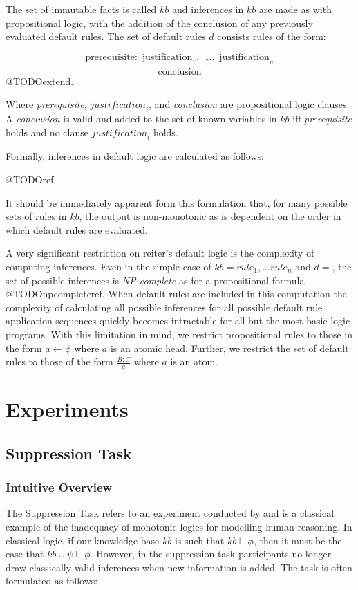 \documentclass[
11pt, %
english, %
singlespacing, %
headsepline, %
]{MastersDoctoralThesis} %
\begin{document}
The set of immutable facts is called $kb$ and inferences in $kb$ are made as with propositional logic, with the addition of the conclusion of any previously evaluated default rules. The set of default rules $d$ consists rules of the form:

\[\frac{\textrm{prerequisite}:\textrm{ justification}_1, \textrm{ ...}, \textrm{ justification}_n}{\textrm{conclusion}}\] @TODOextend.

Where \textit{prerequisite}, $\textit{justification}_i$, and \textit{conclusion} are propositional logic clauses. A \textit{conclusion} is valid and added to the set of known variables in $kb$ iff \textit{prerequisite} holds and no clause $\textit{justification}_i$ holds.

Formally, inferences in default logic are calculated as follows:

@TODOref

It should be immediately apparent form this formulation that, for many possible sets of rules in $kb$, the output is non-monotonic as is dependent on the order in which default rules are evaluated.

A very significant restriction on reiter's default logic is the complexity of computing inferences. Even in the simple case of $kb={rule_1,...rule_n}$ and $d={}$, the set of possible inferences is \textit{NP-complete} as for a propositional formula @TODOnpcompleteref. When default rules are included in this computation the complexity of calculating all possible inferences for all possible default rule application sequences quickly becomes intractable for all but the most basic logic programs. With this limitation in mind, we restrict propositional rules to those in the form $a\leftarrow\phi$ where $a$ is an atomic head. Further, we restrict the set of default rules to those of the form $\frac{B:C}{a}$ where $a$ is an atom.


\chapter{Experiments} \label{chp:experiments}
\section{Suppression Task} \label{sec:sup}
\subsection{Intuitive Overview} \label{ssec:sup_intuition}
The Suppression Task refers to an experiment conducted by \cite{byrne1989suppressing} and is a classical example of the inadequacy of monotonic logics for modelling human reasoning. In classical logic, if our knowledge base $kb$ is such that $kb \models \phi$, then it must be the case that $kb \cup \psi \models \phi$. However, in the suppression task participants no longer draw classically valid inferences when new information is added. The task is often formulated as follows:
\end{document}
